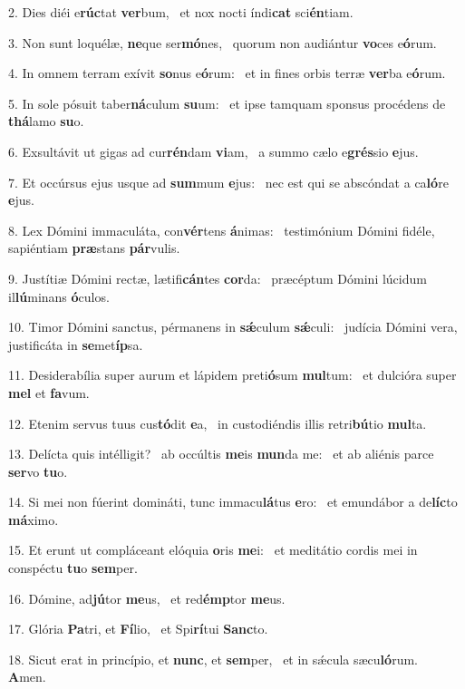 2. Dies diéi e\textbf{rúc}tat \textbf{ver}bum, \ast\  et nox nocti índi\textbf{cat} sci\textbf{én}tiam.\

3. Non sunt loquélæ, \textbf{ne}que ser\textbf{mó}nes, \ast\  quorum non audiántur \textbf{vo}ces e\textbf{ó}rum.\

4. In omnem terram exívit \textbf{so}nus e\textbf{ó}rum: \ast\  et in fines orbis terræ \textbf{ver}ba e\textbf{ó}rum.\

5. In sole pósuit taber\textbf{ná}culum \textbf{su}um: \ast\  et ipse tamquam sponsus procédens de \textbf{thá}lamo \textbf{su}o.\

6. Exsultávit ut gigas ad cur\textbf{rén}dam \textbf{vi}am, \ast\  a summo cælo e\textbf{grés}sio \textbf{e}jus.\

7. Et occúrsus ejus usque ad \textbf{sum}mum \textbf{e}jus: \ast\  nec est qui se abscóndat a ca\textbf{ló}re \textbf{e}jus.\

8. Lex Dómini immaculáta, con\textbf{vér}tens \textbf{á}nimas: \ast\  testimónium Dómini fidéle, sapiéntiam \textbf{præ}stans \textbf{pár}vulis.\

9. Justítiæ Dómini rectæ, lætifi\textbf{cán}tes \textbf{cor}da: \ast\  præcéptum Dómini lúcidum il\textbf{lú}minans \textbf{ó}culos.\

10. Timor Dómini sanctus, pérmanens in \textbf{sǽ}culum \textbf{sǽ}culi: \ast\  judícia Dómini vera, justificáta in \textbf{se}met\textbf{íp}sa.\

11. Desiderabília super aurum et lápidem preti\textbf{ó}sum \textbf{mul}tum: \ast\  et dulcióra super \textbf{mel} et \textbf{fa}vum.\

12. Etenim servus tuus cus\textbf{tó}dit \textbf{e}a, \ast\  in custodiéndis illis retri\textbf{bú}tio \textbf{mul}ta.\

13. Delícta quis intélligit? \dag\  ab occúltis \textbf{me}is \textbf{mun}da me: \ast\  et ab aliénis parce \textbf{ser}vo \textbf{tu}o.\

14. Si mei non fúerint domináti, tunc immacu\textbf{lá}tus \textbf{e}ro: \ast\  et emundábor a de\textbf{líc}to \textbf{má}ximo.\

15. Et erunt ut compláceant elóquia \textbf{o}ris \textbf{me}i: \ast\  et meditátio cordis mei in conspéctu \textbf{tu}o \textbf{sem}per.\

16. Dómine, ad\textbf{jú}tor \textbf{me}us, \ast\  et red\textbf{émp}tor \textbf{me}us.\

17. Glória \textbf{Pa}tri, et \textbf{Fí}lio, \ast\  et Spi\textbf{rí}tui \textbf{Sanc}to.\

18. Sicut erat in princípio, et \textbf{nunc}, et \textbf{sem}per, \ast\  et in sǽcula sæcu\textbf{ló}rum. \textbf{A}men.\

